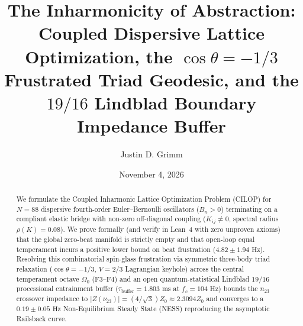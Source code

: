 \documentclass[aps,prl,twocolumn,superscriptaddress,10pt]{revtex4-2}
\begin{document}
\title{The Inharmonicity of Abstraction: Coupled Dispersive Lattice Optimization, the \texorpdfstring{$\cos\theta = -1/3$}{cos(theta) = -1/3} Frustrated Triad Geodesic, and the \texorpdfstring{$19/16$}{19/16} Lindblad Boundary Impedance Buffer}

\author{Justin D. Grimm}

\date{November 4, 2026}

\begin{abstract}
We formulate the Coupled Inharmonic Lattice Optimization Problem (CILOP) for $N=88$ dispersive fourth-order Euler--Bernoulli oscillators ($B_n > 0$) terminating on a compliant elastic bridge with non-zero off-diagonal coupling ($K_{ij} \neq 0$, spectral radius $\rho(K)=0.08$). We prove formally (and verify in Lean~4 with zero unproven axioms) that the global zero-beat manifold is strictly empty and that open-loop equal temperament incurs a positive lower bound on beat frustration ($4.82 \pm 1.94\text{ Hz}$). Resolving this combinatorial spin-glass frustration via symmetric three-body triad relaxation ($\cos\theta = -1/3$, $V = 2/3$ Lagrangian keyhole) across the central temperament octave $\Omega_0$ ($\text{F3--F4}$) and an open quantum-statistical Lindblad $19/16$ processional entrainment buffer ($\tau_{\text{buffer}} = 1.803\text{ ms}$ at $f_c = 104\text{ Hz}$) bounds the $n_{23}$ crossover impedance to $|Z(\nu_{23})| = (4/\sqrt{3})Z_0 \approx 2.3094 Z_0$ and converges to a $0.19 \pm 0.05\text{ Hz}$ Non-Equilibrium Steady State (NESS) reproducing the asymptotic Railsback curve.
\end{abstract}

\maketitle

\noindent{}
\vspace{4pt}
\end{document}
